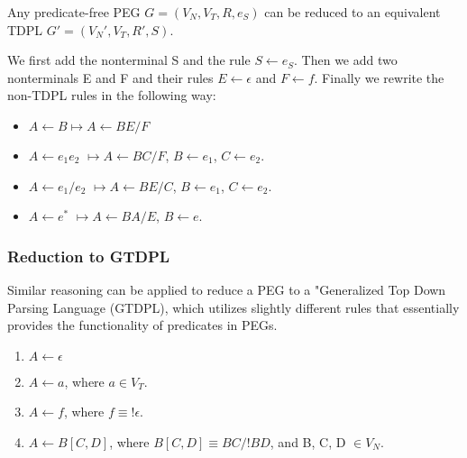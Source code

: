 \begin{frame}
	Any predicate-free PEG $G = (V_N,V_T,R,e_S)$ can be reduced  to an equivalent TDPL $G' = (V_N',V_T,R',S)$.
	
	\begin{block}{}
		We first add the nonterminal S and the rule $S \leftarrow e_S$. Then we add two nonterminals E and F and their rules $E \leftarrow \epsilon$ and $F \leftarrow f$. Finally we rewrite the non-TDPL rules in the following way:\begin{itemize}
			\item $A \leftarrow B \longmapsto  A \leftarrow BE / F$
			\item $A \leftarrow e_1e_2$ $\longmapsto A \leftarrow BC / F$, $ B \leftarrow e_1$, $C \leftarrow e_2$.
			\item $A \leftarrow e_1/e_2$ $\longmapsto A \leftarrow BE/ C$, $ B \leftarrow e_1$, $C \leftarrow e_2$.
			\item $A \leftarrow e^*$ $\longmapsto A \leftarrow BA/ E$, $ B \leftarrow e$.
		\end{itemize}
	\end{block}
\end{frame}

\begin{frame}
	\frametitle{Reduction to GTDPL }
	Similar reasoning can be applied to reduce a PEG to a "Generalized Top Down Parsing Language (GTDPL), which utilizes slightly different rules that essentially provides the functionality of predicates in PEGs.
	
	\begin{block}{}
			\begin{enumerate}
			\item $A \leftarrow \epsilon$
			\item $A \leftarrow a$, where $a \in V_T$.
			\item $A \leftarrow f$, where $f \equiv !\epsilon$.
			\item $A \leftarrow B[C,D]$, where $B[C,D] \equiv BC / !BD$, and  B, C, D $\in V_N$.
		\end{enumerate}
	\end{block}
\end{frame}

